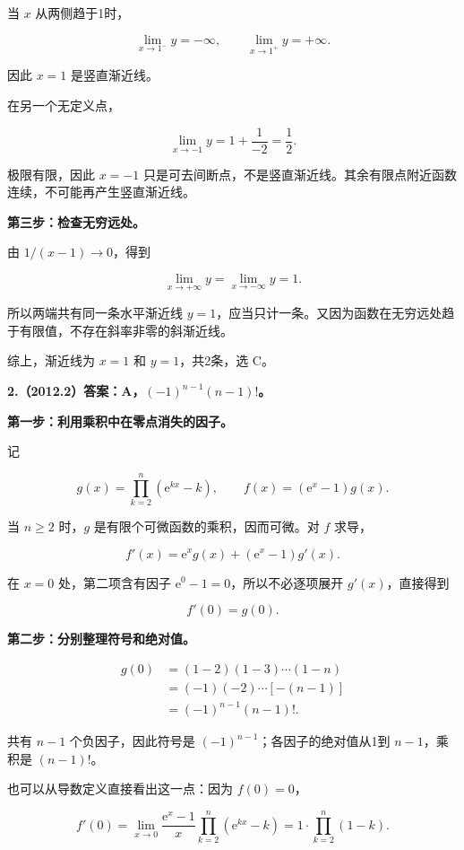 \documentclass[UTF8,11pt,fontset=windows]{ctexart}
\begin{document}
当 $x$ 从两侧趋于1时，

$$
\lim_{x\to1^-}y=-\infty,
\qquad
\lim_{x\to1^+}y=+\infty.
$$

因此 $x=1$ 是竖直渐近线。

在另一个无定义点，

$$
\lim_{x\to-1}y
=1+\frac1{-2}
=\frac12.
$$

极限有限，因此 $x=-1$ 只是可去间断点，不是竖直渐近线。其余有限点附近函数连续，不可能再产生竖直渐近线。

\textbf{第三步：检查无穷远处。}

由 $1/(x-1)\to0$，得到

$$
\lim_{x\to+\infty}y
=\lim_{x\to-\infty}y=1.
$$

所以两端共有同一条水平渐近线 $y=1$，应当只计一条。又因为函数在无穷远处趋于有限值，不存在斜率非零的斜渐近线。

综上，渐近线为 $x=1$ 和 $y=1$，共2条，选 C。

\clearpage

\textbf{2.（2012.2）答案：A，$(-1)^{n-1}(n-1)!$。}

\textbf{第一步：利用乘积中在零点消失的因子。}

记

$$
g(x)=\prod_{k=2}^{n}(\mathrm e^{kx}-k),
\qquad f(x)=(\mathrm e^x-1)g(x).
$$

当 $n\ge2$ 时，$g$ 是有限个可微函数的乘积，因而可微。对 $f$ 求导，

$$
f'(x)=\mathrm e^x g(x)+(\mathrm e^x-1)g'(x).
$$

在 $x=0$ 处，第二项含有因子 $\mathrm e^0-1=0$，所以不必逐项展开 $g'(x)$，直接得到

$$
f'(0)=g(0).
$$

\textbf{第二步：分别整理符号和绝对值。}

$$
\begin{aligned}
g(0)
&=(1-2)(1-3)\cdots(1-n)\\
&=(-1)(-2)\cdots[-(n-1)]\\
&=(-1)^{n-1}(n-1)!.
\end{aligned}
$$

共有 $n-1$ 个负因子，因此符号是 $(-1)^{n-1}$；各因子的绝对值从1到 $n-1$，乘积是 $(n-1)!$。

也可以从导数定义直接看出这一点：因为 $f(0)=0$，

$$
f'(0)=\lim_{x\to0}\frac{\mathrm e^x-1}{x}
\prod_{k=2}^{n}(\mathrm e^{kx}-k)
=1\cdot\prod_{k=2}^{n}(1-k).
$$
\end{document}
